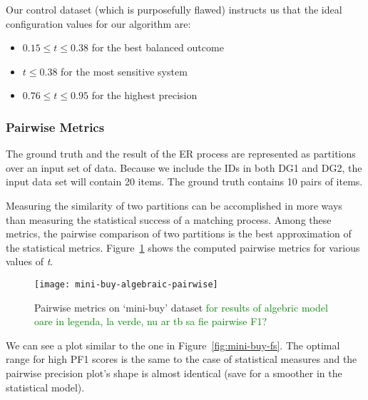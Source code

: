Our control dataset (which is purposefully flawed) instructs us that the ideal
configuration values for our algorithm are:
\begin{itemize}
    \item $0.15 \leq t \leq 0.38$ for the best balanced outcome
    \item $t \leq 0.38$ for the most sensitive system
    \item $0.76 \leq t \leq 0.95$ for the highest precision
\end{itemize}

\subsubsection{Pairwise Metrics}

The ground truth and the result of the ER process are represented as partitions
over an input set of data.
Because we include the IDs in both DG1 and DG2, the input data set will
contain 20 items.
The ground truth contains 10 pairs of items.

Measuring the similarity of two partitions can be accomplished in more ways than
measuring the statistical success of a matching process.
Among these metrics, the pairwise comparison of two partitions is the best
approximation of the statistical metrics\cite{Men10}.
Figure~\ref{fig:mini-alg-pairwise} shows the computed pairwise metrics for
various values of \textit{t}.

\begin{figure}[!h]
    \centering
    \captionsetup{justification=centering}
    \texttt{[image: mini-buy-algebraic-pairwise]}
    \caption{Pairwise metrics on `mini-buy' dataset
    \textcolor{green}{for results of algebric model}\\
    \textcolor{green}{oare in legenda, la verde, nu ar tb sa fie pairwise F1?}
    }
    \label{fig:mini-alg-pairwise}
\end{figure}

We can see a plot similar to the one in Figure~\ref{fig:mini-buy-fs}.
The optimal range for high PF1 scores is the same to the case of statistical measures and the pairwise precision plot's shape
is almost identical (save for a smoother in the statistical model).

